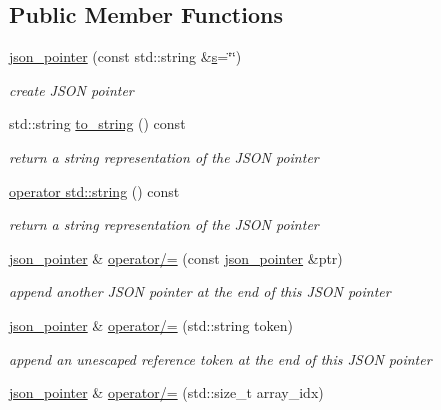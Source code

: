 \subsection*{Public Member Functions}
\begin{DoxyCompactItemize}
\item 
\hyperlink{classnlohmann_1_1json__pointer_a7f32d7c62841f0c4a6784cf741a6e4f8}{json\+\_\+pointer} (const std\+::string \&\hyperlink{classnlohmann_1_1json__pointer_a40846302040a443256386bfa258ea061}{s}=\char`\"{}\char`\"{})
\begin{DoxyCompactList}\small\item\em create J\+S\+ON pointer \end{DoxyCompactList}\item 
std\+::string \hyperlink{classnlohmann_1_1json__pointer_a0e203d3501feea7b7b739bce01de304f}{to\+\_\+string} () const 
\begin{DoxyCompactList}\small\item\em return a string representation of the J\+S\+ON pointer \end{DoxyCompactList}\item 
\hyperlink{classnlohmann_1_1json__pointer_a1c4a7d93216a5de8966e757b34bab64d}{operator std\+::string} () const 
\begin{DoxyCompactList}\small\item\em return a string representation of the J\+S\+ON pointer \end{DoxyCompactList}\item 
\hyperlink{classnlohmann_1_1json__pointer}{json\+\_\+pointer} \& \hyperlink{classnlohmann_1_1json__pointer_a7395bd0af29ac23fd3f21543c935cdfa}{operator/=} (const \hyperlink{classnlohmann_1_1json__pointer}{json\+\_\+pointer} \&ptr)
\begin{DoxyCompactList}\small\item\em append another J\+S\+ON pointer at the end of this J\+S\+ON pointer \end{DoxyCompactList}\item 
\hyperlink{classnlohmann_1_1json__pointer}{json\+\_\+pointer} \& \hyperlink{classnlohmann_1_1json__pointer_abdd21567b2b1d69329af0f520335e68b}{operator/=} (std\+::string token)
\begin{DoxyCompactList}\small\item\em append an unescaped reference token at the end of this J\+S\+ON pointer \end{DoxyCompactList}\item 
\hyperlink{classnlohmann_1_1json__pointer}{json\+\_\+pointer} \& \hyperlink{classnlohmann_1_1json__pointer_a7de51480324eb1c5a89ed552cd699875}{operator/=} (std\+::size\+\_\+t array\+\_\+idx)

\end{DoxyCompactItemize}
